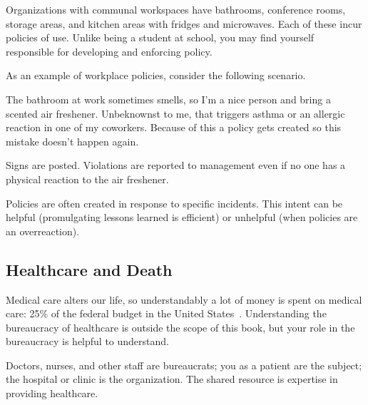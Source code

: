 

Organizations with communal workspaces have \iftoggle{glossarysubstitutionworks}{\glspl{shared resource}:}{shared resources:} bathrooms, conference rooms, storage areas, and kitchen areas with fridges and microwaves. Each of these incur policies of use. Unlike being a student at school, you may find yourself responsible for developing and enforcing policy. 

As an example of workplace policies, consider the following scenario. 
\begin{mdframed}[frametitle={The Bathroom Stinks},frametitlerule=true,frametitlealignment=\centering]
The bathroom at work sometimes smells, so I'm a nice person and bring a scented air freshener. Unbeknownst to me, that triggers asthma or an allergic reaction in one of my coworkers. Because of this a policy gets created so this mistake doesn't happen again. 

Signs are posted. Violations are reported to management even if no one has a physical reaction to the air freshener.
\end{mdframed}

Policies are often created in response to specific incidents. This intent can be helpful (promulgating lessons learned is efficient) or unhelpful (when policies are an overreaction). 

\subsection*{Healthcare and Death\label{sec:bureaucracy-of-death}}
Medical care alters our life, so understandably a lot of money is spent on medical care: 25\% of the federal budget in the United States~\cite{2023_cbpp}. Understanding the bureaucracy of healthcare is outside the scope of this book, but your role in the bureaucracy is helpful to understand.

Doctors, nurses, and other staff are bureaucrats; you as a patient are the subject; the hospital or clinic is the organization. The shared resource is expertise in providing healthcare.

